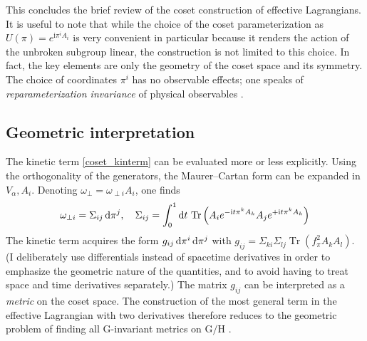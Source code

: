 \documentclass[final,2p,times,12pt,sort&compress]{elsarticle}
\newcommand\gr[1]{\mathrm{#1}}              %
\newcommand\imag{\mathrm i}                 %
\newcommand\dd{\mathop{{\rm d}\!}\nolimits} %
\DeclareMathOperator{\Tr}{Tr}
\begin{document}
This concludes the brief review of the coset construction of effective
Lagrangians. It is useful to note that while the choice of the coset
parameterization as $U(\pi)=e^{\imag\pi^iA_i}$ is very convenient in particular
because it renders the action of the unbroken subgroup linear, the construction
is not limited to this choice. In fact, the key elements are only the geometry
of the coset space and its symmetry. The choice of coordinates $\pi^i$ has no
observable effects; one speaks of \emph{reparameterization invariance} of
physical observables \cite{Coleman:1969sm}.


\subsection{Geometric interpretation}
The kinetic term \eqref{coset_kinterm} can be evaluated more or less
explicitly. Using the orthogonality of the generators, the Maurer--Cartan form
can be expanded in $V_\alpha,A_i$. Denoting $\omega_\perp=\omega_{\perp i}A_i$,
one finds
\begin{equation}
\omega_{\perp i}=\Sigma_{ij}\dd\pi^j,\quad
\Sigma_{ij}=\int_0^1\dd t\,\Tr\left(
A_ie^{-\imag t\pi^kA_k}A_je^{+\imag t\pi^kA_k}
\right)
\end{equation}
The kinetic term acquires the form $g_{ij}\dd\pi^i\dd\pi^j$ with
$g_{ij}=\Sigma_{ki}\Sigma_{lj}\Tr(f_\pi^2A_kA_l)$. (I deliberately use
differentials instead of spacetime derivatives in order to emphasize the
geometric nature of the quantities, and to avoid having to treat space and
time derivatives separately.) The matrix $g_{ij}$ can be interpreted as a
\emph{metric} on the coset space. The construction of the most general term in
the effective Lagrangian with two derivatives therefore reduces to the
geometric problem of finding all $\gr G$-invariant metrics on $\gr{G/H}$
\cite{Leutwyler:1993gf,Leutwyler:1993iq}.
\end{document}
